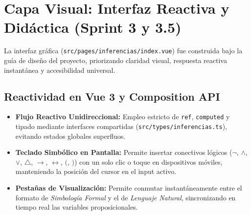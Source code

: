 \documentclass[11pt,a4paper]{article}
\begin{document}
\newpage
\section{Capa Visual: Interfaz Reactiva y Didáctica (Sprint 3 y 3.5)}

La interfaz gráfica (\texttt{src/pages/inferencias/index.vue}) fue construida bajo la guía de diseño del proyecto, priorizando claridad visual, respuesta reactiva instantánea y accesibilidad universal.

\subsection{Reactividad en Vue 3 y Composition API}
\begin{itemize}[leftmargin=1.2cm]
    \item \textbf{Flujo Reactivo Unidireccional:} Empleo estricto de \texttt{ref}, \texttt{computed} y tipado mediante interfaces compartidas (\texttt{src/types/inferencias.ts}), evitando estados globales superfluos.
    \item \textbf{Teclado Simbólico en Pantalla:} Permite insertar conectivos lógicos ($\neg$, $\land$, $\lor$, $\triangle$, $\to$, $\leftrightarrow$, $($, $)$) con un solo clic o toque en dispositivos móviles, manteniendo la posición del cursor en el input activo.
    \item \textbf{Pestañas de Visualización:} Permite conmutar instantáneamente entre el formato de \textit{Simbología Formal} y el de \textit{Lenguaje Natural}, sincronizando en tiempo real las variables proposicionales.
\end{itemize}
\end{document}
